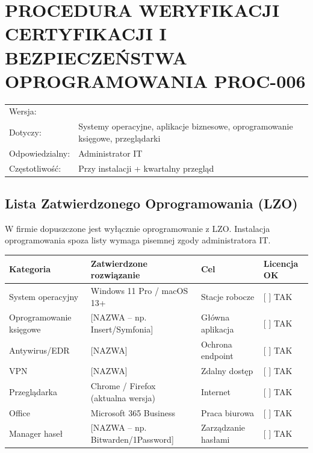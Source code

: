 \documentclass[12pt,a4paper]{article}
\begin{document}
\section{PROCEDURA WERYFIKACJI CERTYFIKACJI I BEZPIECZEŃSTWA
OPROGRAMOWANIA PROC-006}\label{procedura-weryfikacji-certyfikacji-i-bezpieczeux144stwa-oprogramowania}

\begin{longtable}[]{@{}>{\raggedright\arraybackslash}p{}>{\raggedright\arraybackslash}p{}@{}}
\toprule\noalign{}
\endhead
\bottomrule\noalign{}
\endlastfoot
Wersja: & 1.0 \\
Dotyczy: & Systemy operacyjne, aplikacje biznesowe, oprogramowanie
księgowe, przeglądarki \\
Odpowiedzialny: & Administrator IT \\
Częstotliwość: & Przy instalacji + kwartalny przegląd \\
\end{longtable}

\subsection{Lista Zatwierdzonego Oprogramowania
(LZO)}\label{lista-zatwierdzonego-oprogramowania-lzo}

W firmie dopuszczone jest wyłącznie oprogramowanie z LZO. Instalacja
oprogramowania spoza listy wymaga pisemnej zgody administratora IT.

\begin{longtable}[]{@{}>{\raggedright\arraybackslash}p{}>{\raggedright\arraybackslash}p{}>{\raggedright\arraybackslash}p{}>{\raggedright\arraybackslash}p{}@{}}
\toprule\noalign{}
Kategoria & Zatwierdzone rozwiązanie & Cel & Licencja OK \\
\midrule\noalign{}
\endhead
\bottomrule\noalign{}
\endlastfoot
System operacyjny & Windows 11 Pro / macOS 13+ & Stacje robocze & {[}
{]} TAK \\
Oprogramowanie księgowe & {[}NAZWA -- np. Insert/Symfonia{]} & Główna
aplikacja & {[} {]} TAK \\
Antywirus/EDR & {[}NAZWA{]} & Ochrona endpoint & {[} {]} TAK \\
VPN & {[}NAZWA{]} & Zdalny dostęp & {[} {]} TAK \\
Przeglądarka & Chrome / Firefox (aktualna wersja) & Internet & {[} {]}
TAK \\
Office & Microsoft 365 Business & Praca biurowa & {[} {]} TAK \\
Manager haseł & {[}NAZWA -- np. Bitwarden/1Password{]} & Zarządzanie
hasłami & {[} {]} TAK \\
\end{longtable}
\end{document}
